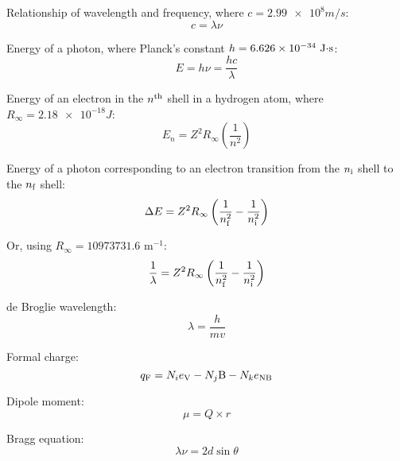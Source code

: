 \documentclass[10pt]{article}
\begin{document}
Relationship of wavelength and frequency, where $c=\num{2.99e8}\unit{m/s}$:
\begin{equation*}
c = \lambda\nu
\end{equation*}

Energy of a photon, where Planck's constant $h=\num{6.626e-34}\textnormal{ J$\cdot$s}$:
\begin{equation*}
E = h\nu = \frac{hc}{\lambda}
\end{equation*}

Energy of an electron in the $n^{\textnormal{th}}$ shell in a hydrogen atom, where $R_\infty=\num{2.18e-18}\unit{J}$:
\begin{equation*}
E_n=Z^2R_\infty\left(\frac{1}{n^2}\right)
\end{equation*}

Energy of a photon corresponding to an electron transition from the $n_\textnormal{i}$ shell to the $n_\textnormal{f}$ shell:
\begin{equation*}
\Delta E = Z^2R_\infty\left(\frac{1}{n_\textnormal{f}^2}-\frac{1}{n_\textnormal{i}^2}\right)
\end{equation*}

Or, using $R_\infty = 10973731.6$ m$^{-1}$:
\begin{equation*}
\frac{1}{\lambda} = Z^2R_\infty\left(\frac{1}{n_\textnormal{f}^2}-\frac{1}{n_\textnormal{i}^2}\right)
\end{equation*}

de Broglie wavelength:
\begin{equation*}
\lambda=\frac{h}{mv}
\end{equation*}

Formal charge:
\begin{equation*}
q_\textnormal{F} = N_ie_\textnormal{V} - N_j\textnormal{B} - N_ke_\textnormal{NB} 
\end{equation*}

Dipole moment:
\begin{equation*}
\mu = Q\times r
\end{equation*}

Bragg equation:
\begin{equation*}
\lambda\nu = 2d \sin \theta
\end{equation*}

\newpage
\end{document}
